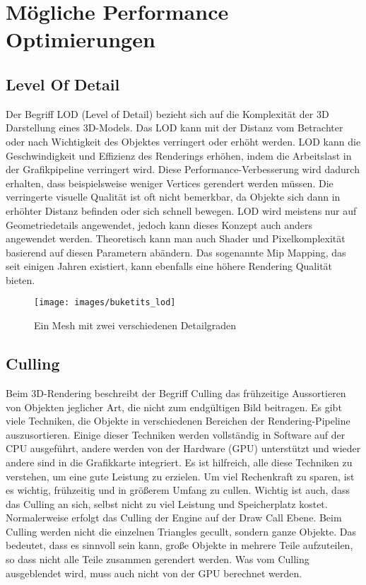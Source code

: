 \chapter{Mögliche Performance Optimierungen} \label{simon_performance}
\section{Level Of Detail}
Der Begriff LOD (Level of Detail) bezieht sich auf die Komplexität der 3D Darstellung eines 3D-Models. Das LOD kann mit der Distanz vom Betrachter oder nach Wichtigkeit des Objektes verringert oder erhöht werden. LOD kann die Geschwindigkeit und Effizienz des Renderings erhöhen, indem die Arbeitslast in der Grafikpipeline verringert wird. Diese Performance-Verbesserung wird dadurch erhalten, dass beispielsweise weniger Vertices gerendert werden müssen. Die verringerte visuelle Qualität ist oft nicht bemerkbar, da Objekte sich dann in erhöhter Distanz befinden oder sich schnell bewegen. LOD wird meistens nur auf Geometriedetails angewendet, jedoch kann dieses Konzept auch anders angewendet werden. Theoretisch kann man auch Shader und Pixelkomplexität basierend auf diesen Parametern abändern. Das sogenannte Mip Mapping, das seit einigen Jahren existiert, kann ebenfalls eine höhere Rendering Qualität bieten.

\begin{figure}[H]
	\centering
	\texttt{[image: images/buketits\_lod]}
	\caption{Ein Mesh mit zwei verschiedenen Detailgraden\cite{_lod_formeshes}}
\end{figure}


\section{Culling}
Beim 3D-Rendering beschreibt der Begriff Culling das frühzeitige Aussortieren von Objekten jeglicher Art, die nicht zum endgültigen Bild beitragen. Es gibt viele Techniken, die Objekte in verschiedenen Bereichen der Rendering-Pipeline auszusortieren. Einige dieser Techniken werden vollständig in Software auf der CPU ausgeführt, andere werden von der Hardware (GPU) unterstützt und wieder andere sind in die Grafikkarte integriert. Es ist hilfreich, alle diese Techniken zu verstehen, um eine gute Leistung zu erzielen. Um viel Rechenkraft zu sparen, ist es wichtig, frühzeitig und in größerem Umfang zu cullen. Wichtig ist auch, dass das Culling an sich, selbst nicht zu viel Leistung und Speicherplatz kostet.
Normalerweise erfolgt das Culling der Engine auf der Draw Call Ebene. Beim Culling werden nicht die einzelnen Triangles gecullt, sondern ganze Objekte. Das bedeutet, dass es sinnvoll sein kann, große Objekte in mehrere Teile aufzuteilen, so dass nicht alle Teile zusammen gerendert werden.
Was vom Culling ausgeblendet wird, muss auch nicht von der GPU berechnet werden.

